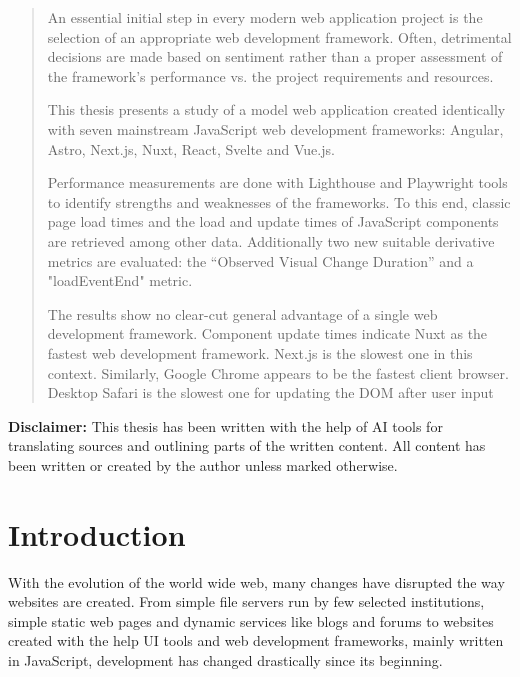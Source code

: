 \documentclass[a4paper, 12pt]{article}
\providecommand{\keywords}[1]
{
  {
    \footnotesize
    \textit{\textbf{Keywords ---} #1}
  } 
}
\begin{document}
\begin{abstract}
  An essential initial step in every modern web application project is the selection of an appropriate web development framework.
  Often, detrimental decisions are made based on sentiment rather than a proper assessment of the framework's performance vs. the project requirements and resources.

  This thesis presents a study of a model web application created identically with seven mainstream JavaScript web development frameworks: Angular, Astro, Next.js, Nuxt, React, Svelte and Vue.js.

  Performance measurements are done with Lighthouse and Playwright tools to identify strengths and weaknesses of the frameworks.
  To this end, classic page load times and the load and update times of JavaScript components are retrieved among other data.
  Additionally two new suitable derivative metrics are evaluated: the \enquote{Observed Visual Change Duration} and a "loadEventEnd" metric.

  The results show no clear-cut general advantage of a single web development framework.
  Component update times indicate Nuxt as the fastest web development framework.
  Next.js is the slowest one in this context.
  Similarly, Google Chrome appears to be the fastest client browser.
  Desktop Safari is the slowest one for updating the DOM after user input
\end{abstract}


\vfill

\noindent\textbf{Disclaimer:} This thesis has been written with the help of AI tools for translating sources and outlining parts of the written content.
All content has been written or created by the author unless marked otherwise.

\pagebreak

\tableofcontents
\pagebreak

\section{Introduction}\label{sec:introduction}
With the evolution of the world wide web, many changes have disrupted the way websites are created.
From simple file servers run by few selected institutions, simple static web pages and dynamic services like blogs and forums to websites created with the help UI tools and web development frameworks, mainly written in JavaScript, development has changed drastically since its beginning.
\end{document}
